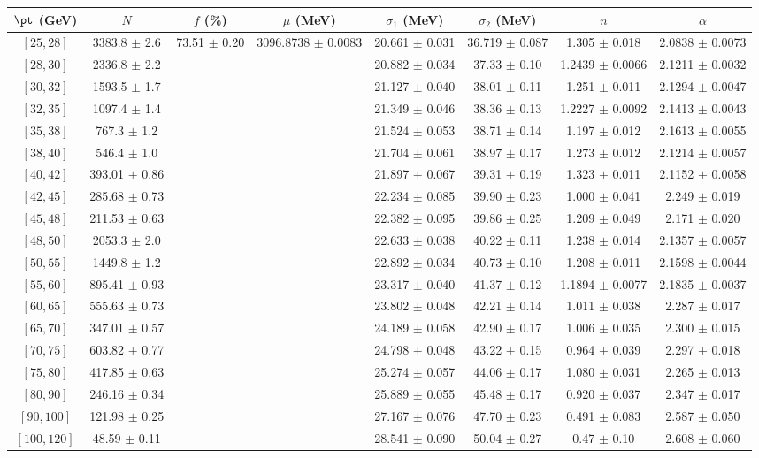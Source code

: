 \begin{tabular}{c||c|c|c|c|c|c|c}
$\pt$ (GeV) & $N$ & $f$ (\%) & $\mu$ (MeV) & $\sigma_1$ (MeV) & $\sigma_2$ (MeV) & $n$ & $\alpha$ \\
\hline
$[25, 28]$ & 3383.8 $\pm$ 2.6 & \multirow{19}{*}{73.51 $\pm$ 0.20} & \multirow{19}{*}{3096.8738 $\pm$ 0.0083} & 20.661 $\pm$ 0.031 & 36.719 $\pm$ 0.087 & 1.305 $\pm$ 0.018 & 2.0838 $\pm$ 0.0073\\
$[28, 30]$ & 2336.8 $\pm$ 2.2 &  &  & 20.882 $\pm$ 0.034 & 37.33 $\pm$ 0.10 & 1.2439 $\pm$ 0.0066 & 2.1211 $\pm$ 0.0032\\
$[30, 32]$ & 1593.5 $\pm$ 1.7 &  &  & 21.127 $\pm$ 0.040 & 38.01 $\pm$ 0.11 & 1.251 $\pm$ 0.011 & 2.1294 $\pm$ 0.0047\\
$[32, 35]$ & 1097.4 $\pm$ 1.4 &  &  & 21.349 $\pm$ 0.046 & 38.36 $\pm$ 0.13 & 1.2227 $\pm$ 0.0092 & 2.1413 $\pm$ 0.0043\\
$[35, 38]$ & 767.3 $\pm$ 1.2 &  &  & 21.524 $\pm$ 0.053 & 38.71 $\pm$ 0.14 & 1.197 $\pm$ 0.012 & 2.1613 $\pm$ 0.0055\\
$[38, 40]$ & 546.4 $\pm$ 1.0 &  &  & 21.704 $\pm$ 0.061 & 38.97 $\pm$ 0.17 & 1.273 $\pm$ 0.012 & 2.1214 $\pm$ 0.0057\\
$[40, 42]$ & 393.01 $\pm$ 0.86 &  &  & 21.897 $\pm$ 0.067 & 39.31 $\pm$ 0.19 & 1.323 $\pm$ 0.011 & 2.1152 $\pm$ 0.0058\\
$[42, 45]$ & 285.68 $\pm$ 0.73 &  &  & 22.234 $\pm$ 0.085 & 39.90 $\pm$ 0.23 & 1.000 $\pm$ 0.041 & 2.249 $\pm$ 0.019\\
$[45, 48]$ & 211.53 $\pm$ 0.63 &  &  & 22.382 $\pm$ 0.095 & 39.86 $\pm$ 0.25 & 1.209 $\pm$ 0.049 & 2.171 $\pm$ 0.020\\
$[48, 50]$ & 2053.3 $\pm$ 2.0 &  &  & 22.633 $\pm$ 0.038 & 40.22 $\pm$ 0.11 & 1.238 $\pm$ 0.014 & 2.1357 $\pm$ 0.0057\\
$[50, 55]$ & 1449.8 $\pm$ 1.2 &  &  & 22.892 $\pm$ 0.034 & 40.73 $\pm$ 0.10 & 1.208 $\pm$ 0.011 & 2.1598 $\pm$ 0.0044\\
$[55, 60]$ & 895.41 $\pm$ 0.93 &  &  & 23.317 $\pm$ 0.040 & 41.37 $\pm$ 0.12 & 1.1894 $\pm$ 0.0077 & 2.1835 $\pm$ 0.0037\\
$[60, 65]$ & 555.63 $\pm$ 0.73 &  &  & 23.802 $\pm$ 0.048 & 42.21 $\pm$ 0.14 & 1.011 $\pm$ 0.038 & 2.287 $\pm$ 0.017\\
$[65, 70]$ & 347.01 $\pm$ 0.57 &  &  & 24.189 $\pm$ 0.058 & 42.90 $\pm$ 0.17 & 1.006 $\pm$ 0.035 & 2.300 $\pm$ 0.015\\
$[70, 75]$ & 603.82 $\pm$ 0.77 &  &  & 24.798 $\pm$ 0.048 & 43.22 $\pm$ 0.15 & 0.964 $\pm$ 0.039 & 2.297 $\pm$ 0.018\\
$[75, 80]$ & 417.85 $\pm$ 0.63 &  &  & 25.274 $\pm$ 0.057 & 44.06 $\pm$ 0.17 & 1.080 $\pm$ 0.031 & 2.265 $\pm$ 0.013\\
$[80, 90]$ & 246.16 $\pm$ 0.34 &  &  & 25.889 $\pm$ 0.055 & 45.48 $\pm$ 0.17 & 0.920 $\pm$ 0.037 & 2.347 $\pm$ 0.017\\
$[90, 100]$ & 121.98 $\pm$ 0.25 &  &  & 27.167 $\pm$ 0.076 & 47.70 $\pm$ 0.23 & 0.491 $\pm$ 0.083 & 2.587 $\pm$ 0.050\\
$[100, 120]$ & 48.59 $\pm$ 0.11 &  &  & 28.541 $\pm$ 0.090 & 50.04 $\pm$ 0.27 & 0.47 $\pm$ 0.10 & 2.608 $\pm$ 0.060\\
\end{tabular}
